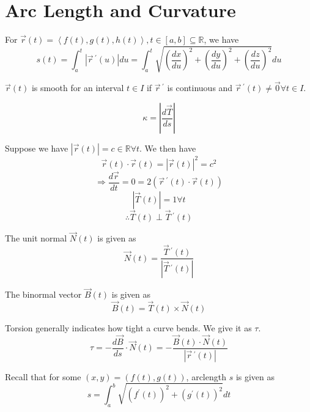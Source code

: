 \section{Arc Length and Curvature}
\begin{definition}
    For \(\vec{r}(t)=\left\langle f(t),g(t),h(t) \right\rangle,t\in[a,b]\subseteq \mathbb{R}  \), we have
    \[
        s(t)=\int _a^t \left|\vec{r}\,^{\prime} (u)\right|du=\int_a^t \sqrt{\left( \frac{dx}{du} \right)^{2}+\left( \frac{dy}{du} \right)^2 +\left( \frac{dz}{du} \right)^2    }du  
    \]
\end{definition}
\begin{definition}
    \(\vec{r}(t)\) is smooth for an interval \(t\in I\)  if \(\vec{r}\,^{\prime} \) is continuous and \(\vec{r}\,^{\prime} (t)\neq \vec{0} \forall t\in I\). 
\end{definition}
\begin{definition}
\[
    \kappa =\left\vert \frac{d\vec{T}}{ds} \right\vert
\]
\end{definition}
Suppose we have \(\left|\vec{r}(t)\right| = c\in\mathbb{R} \forall t\). We then have
\[
    \vec{r}(t)\cdot\vec{r}(t)=\left|\vec{r}(t)\right|^2=c^2
\]
\[
    \Longrightarrow \frac{d\vec{r}}{dt}=0=2(\vec{r}\,^{\prime} (t)\cdot\vec{r}(t))
\]
\[
    \left|\vec{T}(t)\right| =1\forall t
\]
\[
    \therefore\vec{T}(t)\perp\vec{T}\,^{\prime} (t)
\]
\begin{definition}
    The unit normal \(\vec{N}(t)\) is given as 
    \[
        \vec{N}(t)=\frac{\vec{T}\,^{\prime} (t)}{\left\vert \vec{T}\,^{\prime} (t) \right\vert }
    \]
\end{definition}
\begin{definition}
    The binormal vector \(\vec{B}(t)\) is given as
    \[
        \vec{B}(t)=\vec{T}(t)\times\vec{N}(t)
    \]
\end{definition}
\begin{definition}
    Torsion generally indicates how tight a curve bends. We give it as \(\tau \).
    \[
        \tau =-\frac{d\vec{B}}{ds}\cdot\vec{N}(t)=-\frac{\vec{B}(t)\cdot\vec{N}(t)}{\left\vert \vec{r}\,^{\prime} (t) \right\vert }
    \]    
\end{definition}
Recall that for some \((x,y)=(f(t),g(t))\), arclength \(s\) is given as
\[
    s=\int_a^b \sqrt{(f^{\prime} (t))^2 +(g^{\prime} (t))^2} dt
\]
